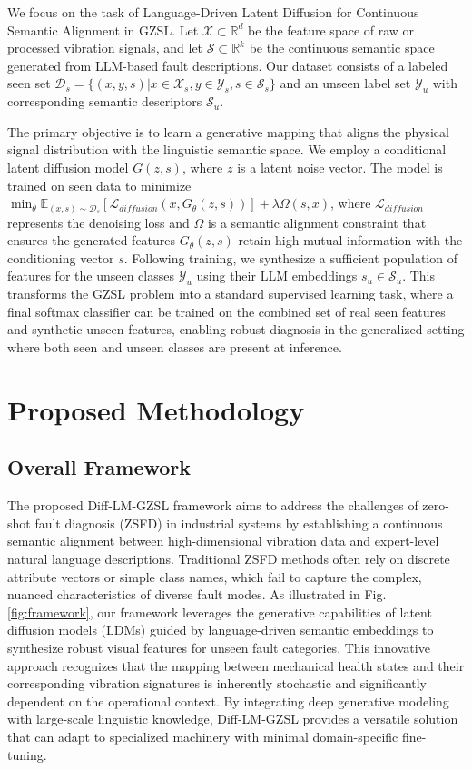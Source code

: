 \documentclass[journal]{IEEEtran}
\begin{document}
We focus on the task of Language-Driven Latent Diffusion for Continuous Semantic Alignment in GZSL. Let $\mathcal{X} \subset \mathbb{R}^d$ be the feature space of raw or processed vibration signals, and let $\mathcal{S} \subset \mathbb{R}^k$ be the continuous semantic space generated from LLM-based fault descriptions. Our dataset consists of a labeled seen set $\mathcal{D}_s = \{(x, y, s) | x \in \mathcal{X}_s, y \in \mathcal{Y}_s, s \in \mathcal{S}_s\}$ and an unseen label set $\mathcal{Y}_u$ with corresponding semantic descriptors $\mathcal{S}_u$.

The primary objective is to learn a generative mapping that aligns the physical signal distribution with the linguistic semantic space. We employ a conditional latent diffusion model $G(z, s)$, where $z$ is a latent noise vector. The model is trained on seen data to minimize $\min_{\theta} \mathbb{E}_{(x, s) \sim \mathcal{D}_s} [ \mathcal{L}_{diffusion}(x, G_\theta(z, s)) ] + \lambda \Omega(s, x)$, where $\mathcal{L}_{diffusion}$ represents the denoising loss and $\Omega$ is a semantic alignment constraint that ensures the generated features $G_\theta(z, s)$ retain high mutual information with the conditioning vector $s$. Following training, we synthesize a sufficient population of features for the unseen classes $\mathcal{Y}_u$ using their LLM embeddings $s_u \in \mathcal{S}_u$. This transforms the GZSL problem into a standard supervised learning task, where a final softmax classifier can be trained on the combined set of real seen features and synthetic unseen features, enabling robust diagnosis in the generalized setting where both seen and unseen classes are present at inference.
\section{Proposed Methodology}
\label{sec:method}
\subsection{Overall Framework}
\label{sec:framework}
The proposed Diff-LM-GZSL framework aims to address the challenges of zero-shot fault diagnosis (ZSFD) in industrial systems by establishing a continuous semantic alignment between high-dimensional vibration data and expert-level natural language descriptions. Traditional ZSFD methods often rely on discrete attribute vectors or simple class names, which fail to capture the complex, nuanced characteristics of diverse fault modes. As illustrated in Fig. \ref{fig:framework}, our framework leverages the generative capabilities of latent diffusion models (LDMs) guided by language-driven semantic embeddings to synthesize robust visual features for unseen fault categories. This innovative approach recognizes that the mapping between mechanical health states and their corresponding vibration signatures is inherently stochastic and significantly dependent on the operational context. By integrating deep generative modeling with large-scale linguistic knowledge, Diff-LM-GZSL provides a versatile solution that can adapt to specialized machinery with minimal domain-specific fine-tuning.
\end{document}

